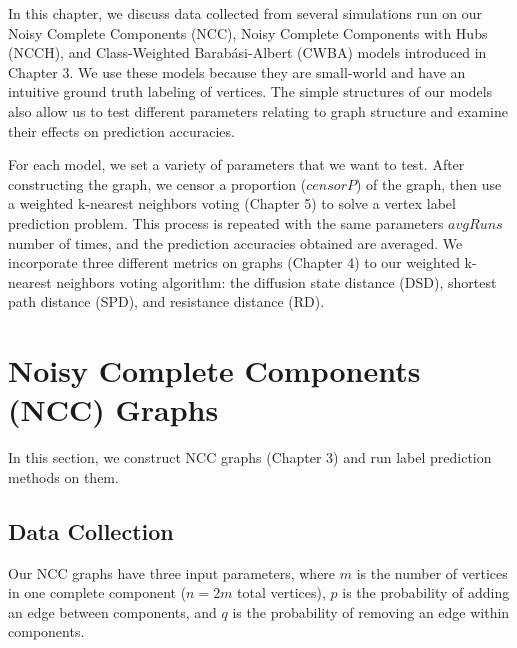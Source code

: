 In this chapter, we discuss data collected from several simulations run on
our Noisy Complete Components (NCC), Noisy Complete Components with Hubs
(NCCH), and Class-Weighted Barab\'{a}si-Albert (CWBA) models introduced in
Chapter 3. We use these models because they are small-world and have an
intuitive ground truth labeling of vertices. The simple structures of our
models also allow us to test different parameters relating to graph 
structure and examine their effects on prediction accuracies.

For each model, we set a variety of parameters that we want to test.
After constructing the graph, we censor a proportion ($censorP$) of the 
graph, then use a weighted k-nearest neighbors voting (Chapter 5) to solve
a vertex label prediction problem. This process is repeated with the same
parameters $avgRuns$ number of times, and the prediction accuracies
obtained are averaged. We incorporate three different metrics on graphs
(Chapter 4) to our weighted k-nearest neighbors voting algorithm: 
the diffusion state distance (DSD), shortest path distance (SPD), and
resistance distance (RD).


\section{Noisy Complete Components (NCC) Graphs}
In this section, we construct NCC graphs (Chapter 3) and run label 
prediction methods on them.

\subsection{Data Collection}
Our NCC graphs have three input parameters, where $m$ is the number of
vertices in one complete component ($n = 2m$ total vertices), $p$ is the
probability of adding an edge between components, and $q$ is the 
probability of removing an edge within components.

